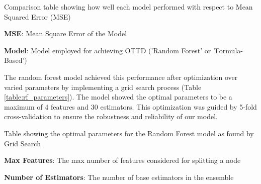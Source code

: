 \documentclass[11pt]{article}
\begin{document}
\begin{table}[h]
\caption{Comparison of Mean Squred Error of Two Models: Random Forest and Formula-Based model}
\label{table:comparison_of_MSE}
\begin{threeparttable}
\renewcommand{\TPTminimum}{\linewidth}
\begin{tablenotes}
\footnotesize
\item Comparison table showing how well each model performed with respect to Mean Squared Error (MSE)
\item \textbf{MSE}: Mean Square Error of the Model
\item \textbf{Model}: Model employed for achieving OTTD ('Random Forest' or 'Formula-Based')
\end{tablenotes}
\end{threeparttable}
\end{table}


The random forest model achieved this performance after optimization over varied parameters by implementing a grid search process (Table \ref{table:rf_parameters}). The model showed the optimal parameters to be a maximum of 4 features and 30 estimators. This optimization was guided by 5-fold cross-validation to ensure the robustness and reliability of our model.

\begin{table}[h]
\caption{Best parameters used for the Random Forest model}
\label{table:rf_parameters}
\begin{threeparttable}
\renewcommand{\TPTminimum}{\linewidth}
\begin{tablenotes}
\footnotesize
\item Table showing the optimal parameters for the Random Forest model as found by Grid Search
\item \textbf{Max Features}: The max number of features considered for splitting a node
\item \textbf{Number of Estimators}: The number of base estimators in the ensemble
\end{tablenotes}
\end{threeparttable}
\end{table}
\end{document}
